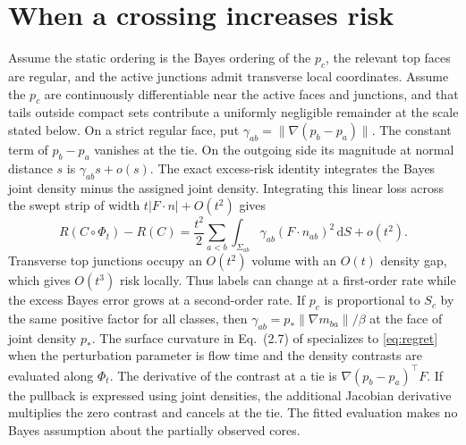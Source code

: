 \documentclass[10pt]{article}
\newcommand{\dd}{\mathrm{d}}
\newcommand{\norm}[1]{\lVert #1\rVert}
\begin{document}
\section{When a crossing increases risk}
\label{sec:bayes}
Assume the static ordering is the Bayes ordering of the $p_c$, the relevant top faces are regular, and the active junctions admit transverse local coordinates. Assume the $p_c$ are continuously differentiable near the active faces and junctions, and that tails outside compact sets contribute a uniformly negligible remainder at the scale stated below. On a strict regular face, put $\gamma_{ab}=\norm{\nabla(p_b-p_a)}$. The constant term of $p_b-p_a$ vanishes at the tie. On the outgoing side its magnitude at normal distance $s$ is $\gamma_{ab}s+o(s)$. The exact excess-risk identity integrates the Bayes joint density minus the assigned joint density. Integrating this linear loss across the swept strip of width $t|F\cdot n|+O(t^2)$ gives
\begin{equation}
 R(C\circ\Phi_t)-R(C)=
 \frac{t^2}{2}\sum_{a<b}\int_{\Sigma_{ab}}\gamma_{ab}(F\cdot n_{ab})^2\,\dd S +o(t^2).
 \label{eq:regret}
\end{equation}
Transverse top junctions occupy an $O(t^2)$ volume with an $O(t)$ density gap, which gives $O(t^3)$ risk locally. Thus labels can change at a first-order rate while the excess Bayes error grows at a second-order rate. If $p_c$ is proportional to $S_c$ by the same positive factor for all classes, then $\gamma_{ab}=p_* \norm{\nabla m_{ba}}/\beta$ at the face of joint density $p_*$. The surface curvature in Eq.~(2.7) of \cite{setoudeh} specializes to \eqref{eq:regret} when the perturbation parameter is flow time and the density contrasts are evaluated along $\Phi_t$. The derivative of the contrast at a tie is $\nabla(p_b-p_a)^\top F$. If the pullback is expressed using joint densities, the additional Jacobian derivative multiplies the zero contrast and cancels at the tie. The fitted evaluation makes no Bayes assumption about the partially observed cores.
\end{document}
